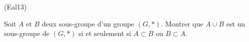 \begin{tiny}(Eal13)\end{tiny} Soit $A$ et $B$ deux sous-groupe d'un groupe $(G,*)$. Montrer que $A\cup B$ est un sous-groupe de $(G,*)$ si et seulement si $A\subset B$ ou $B\subset A$.